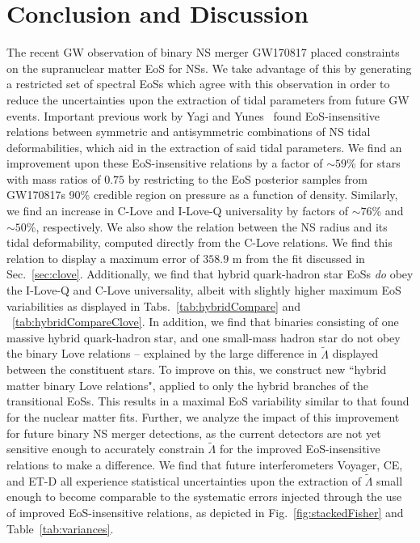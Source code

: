 \documentclass[prd,twocolumn,nofootinbib,superscriptaddress,amsmath,amssymb]{revtex4-1}
\begin{document}
\section{Conclusion and Discussion}\label{sec:conclusion}
The recent GW observation of binary NS merger GW170817 placed constraints on the supranuclear matter EoS for NSs.
We take advantage of this by generating a restricted set of spectral EoSs which agree with this observation in order to reduce the uncertainties upon the extraction of tidal parameters from future GW events.
Important previous work by Yagi and Yunes~\cite{Yagi:ILQ,Yagi:binLove} found EoS-insensitive relations between symmetric and antisymmetric combinations of NS tidal deformabilities, which aid in the extraction of said tidal parameters.
We find an improvement upon these EoS-insensitive relations by a factor of $\sim 59$\% for stars with mass ratios of $0.75$ by restricting to the EoS posterior samples from GW170817s 90\% credible region on pressure as a function of density.
Similarly, we find an increase in C-Love and I-Love-Q universality by factors of $\sim 76$\% and $\sim 50$\%, respectively.
We also show the relation between the NS radius and its tidal deformability, computed directly from the C-Love relations.
We find this relation to display a maximum error of $358.9\text{ m}$ from the fit discussed in Sec.~\ref{sec:clove}.
Additionally, we find that hybrid quark-hadron star EoSs \emph{do} obey the I-Love-Q and C-Love universality, albeit with slightly higher maximum EoS variabilities as displayed in Tabs.~\ref{tab:hybridCompare} and ~\ref{tab:hybridCompareClove}.
In addition, we find that binaries consisting of one massive hybrid quark-hadron star, and one small-mass hadron star do not obey the binary Love relations -- explained by the large difference in $\tilde{\Lambda}$ displayed between the constituent stars.
To improve on this, we construct new ``hybrid matter binary Love relations", applied to only the hybrid branches of the transitional EoSs.
This results in a maximal EoS variability similar to that found for the nuclear matter fits.
Further, we analyze the impact of this improvement for future binary NS merger detections, as the current detectors are not yet sensitive enough to accurately constrain $\tilde{\Lambda}$ for the improved EoS-insensitive relations to make a difference.
We find that future interferometers Voyager, CE, and ET-D all experience statistical uncertainties upon the extraction of $\tilde{\Lambda}$ small enough to become comparable to the systematic errors injected through the use of improved EoS-insensitive relations, as depicted in Fig.~\ref{fig:stackedFisher} and Table~\ref{tab:variances}.
\end{document}
